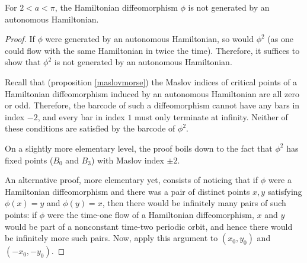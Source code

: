 \begin{corollary}
For $2 < a < \pi$, the Hamiltonian diffeomorphism $\phi$ is not generated by an autonomous Hamiltonian.
\end{corollary}

\begin{proof}
If $\phi$ were generated by an autonomous Hamiltonian, so would $\phi^2$ (as one could flow with the same Hamiltonian in twice the time). Therefore, it suffices to show that $\phi^2$ is not generated by an autonomous Hamiltonian.

Recall that (proposition \ref{maslovmorse}) the Maslov indices of critical points of a Hamiltonian diffeomorphism induced by an autonomous Hamiltonian are all zero or odd. Therefore, the barcode of such a diffeomorphism cannot have any bars in index $-2$, and every bar in index $1$ must only terminate at infinity. Neither of these conditions are satisfied by the barcode of $\phi^2$.

On a slightly more elementary level, the proof boils down to the fact that $\phi^2$ has fixed points ($B_0$ and $B_3$) with Maslov index $\pm 2$.

An alternative proof, more elementary yet, consists of noticing that if $\phi$ were a Hamiltonian diffeomorphism and there was a pair of distinct points $x, y$ satisfying $\phi(x) = y$ and $\phi(y) = x$, then there would be infinitely many pairs of such points: if $\phi$ were the time-one flow of a Hamiltonian diffeomorphism, $x$ and $y$ would be part of a nonconstant time-two periodic orbit, and hence there would be infinitely more such pairs. Now, apply this argument to $(x_0,y_0)$ and $(-x_0,-y_0)$.
\end{proof}

